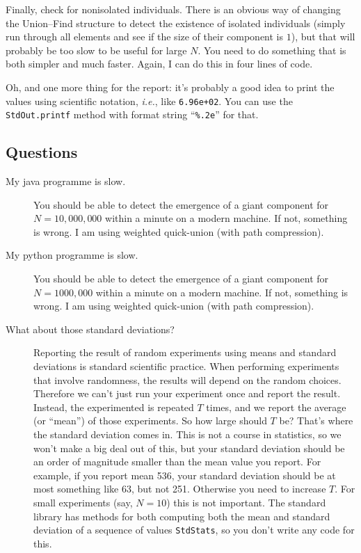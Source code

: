 \documentclass{tufte-handout}
\begin{document}
Finally, check for nonisolated individuals.
There is an obvious way of changing the Union--Find structure to detect
the existence of isolated individuals (simply run through all elements
and see if the size of their component is $1$), but that will probably
be too slow to be useful for large $N$.
You need to do something that is both simpler and much faster.
Again, I can do this in four lines of code.

Oh, and one more thing for the report: it's probably a good idea to print the values
using scientific notation, \emph{i.e.}, like {\tt 6.96e+02}.
You can use the {\tt StdOut.printf} method with format string
``{\tt \%.2e}''  for that.

\subsection{Questions}
\begin{description}
\item[My java programme is slow.] You should be able to detect the emergence
  of a giant component for $N=10,000,000$ within a minute on a modern
  machine.
  If not, something is wrong.
  I am using weighted quick-union (with path compression).
\item[My python programme is slow.] You should be able to detect the emergence
  of a giant component for $N=1000,000$ within a minute on a modern
  machine.
  If not, something is wrong.
  I am using weighted quick-union (with path compression).
\item[What about those standard deviations?]
	Reporting the result of random experiments using means and standard deviations is standard scientific practice.
  When performing experiments that involve randomness,
  the results will depend on the random choices.
  Therefore we can't just run your experiment once and report the result.
  Instead, the experimented is repeated $T$ times, and we report the average
  (or ``mean'') of those experiments.
  So how large should $T$ be?
  That's where the standard deviation comes in.
  This is not a course in statistics, so we won't make a big deal out
  of this, but your standard deviation should be an order of magnitude
  smaller than the mean value you report.
  For example, if you report mean 536, your standard deviation should
  be at most something like 63, but not 251.
  Otherwise you need to increase $T$.
  For small experiments (say, $N=10$) this is not important.
  The standard library has methods for both computing both the mean and standard
  deviation of a sequence of values {\tt StdStats}, so you don't write any code for this.
\end{description}
\end{document}
